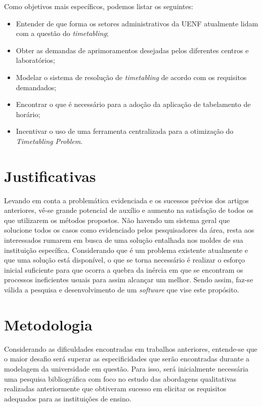 Como objetivos mais específicos, podemos listar os seguintes:

\begin{itemize}
  \item Entender de que forma os setores administrativos da UENF atualmente lidam com a questão do \textit{timetabling};
  \item Obter as demandas de aprimoramentos desejadas pelos diferentes centros e laboratórios;
  \item Modelar o sistema de resolução de \textit{timetabling} de acordo com os requisitos demandados;
  \item Encontrar o que é necessário para a adoção da aplicação de tabelamento de horário;
  \item Incentivar o uso de uma ferramenta centralizada para a otimização do \textit{Timetabling Problem}.
\end{itemize}

\section{Justificativas} \label{sec:Justificativas} %

Levando em conta a problemática evidenciada e os sucessos prévios dos artigos anteriores, vê-se grande potencial de auxílio e aumento na satisfação de todos os que utilizarem os métodos propostos. Não havendo um sistema geral que solucione todos os casos como evidenciado pelos pesquisadores da área, resta aos interessados rumarem em busca de uma solução entalhada nos moldes de sua instituição específica. Considerando que é um problema existente atualmente e que uma solução está disponível, o que se torna necessário é realizar o esforço inicial suficiente para que ocorra a quebra da inércia em que se encontram os processos ineficientes usuais para assim alcançar um melhor. Sendo assim, faz-se válida a pesquisa e desenvolvimento de um \textit{software} que vise este propósito.

\section{Metodologia} \label{sec:Metodologia} %

Considerando as dificuldades encontradas em trabalhos anteriores, entende-se que o maior desafio será superar as especificidades que serão encontradas durante a modelagem da universidade em questão. Para isso, será inicialmente necessária uma pesquisa bibliográfica com foco no estudo das abordagens qualitativas realizadas anteriormente que obtiveram sucesso em elicitar os requisitos adequados para as instituições de ensino.

